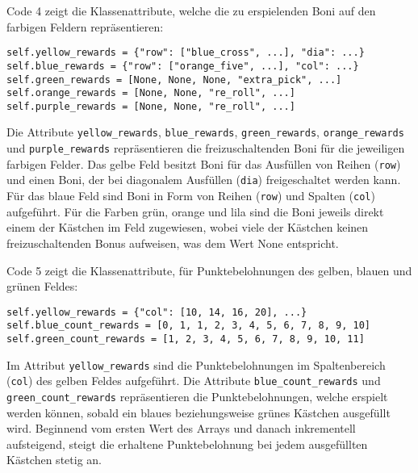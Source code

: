 \begin{minipage}{\linewidth}
Code 4 zeigt die Klassenattribute, welche die zu erspielenden Boni auf den farbigen Feldern repräsentieren:
\vspace{0.5cm}
\begin{lstlisting}[caption={Klassenattribute für freizuschaltende Boni}, basicstyle=\ttfamily]
self.yellow_rewards = {"row": ["blue_cross", ...], "dia": ...}
self.blue_rewards = {"row": ["orange_five", ...], "col": ...}
self.green_rewards = [None, None, None, "extra_pick", ...]
self.orange_rewards = [None, None, "re_roll", ...]
self.purple_rewards = [None, None, "re_roll", ...]
\end{lstlisting}
\end{minipage}

Die Attribute \texttt{yellow\_rewards}, \texttt{blue\_rewards}, \texttt{green\_rewards}, \texttt{orange\_rewards} und \texttt{purple\_rewards} repräsentieren die freizuschaltenden Boni für die jeweiligen farbigen Felder. Das gelbe Feld besitzt Boni für das Ausfüllen von Reihen (\texttt{row}) und einen Boni, der bei diagonalem Ausfüllen (\texttt{dia}) freigeschaltet werden kann. Für das blaue Feld sind Boni in Form von Reihen (\texttt{row}) und Spalten (\texttt{col}) aufgeführt. Für die Farben grün, orange und lila sind die Boni jeweils direkt einem der Kästchen im Feld zugewiesen, wobei viele der Kästchen keinen freizuschaltenden Bonus aufweisen, was dem Wert None entspricht.\\

\begin{minipage}{\linewidth}
Code 5 zeigt die Klassenattribute, für Punktebelohnungen des gelben, blauen und grünen Feldes:
\vspace{0.5cm}
\begin{lstlisting}[caption={Klassenattribute für freizuschaltende Punktebelohnungen des gelben, blauen und grünen Feldes}, basicstyle=\ttfamily]
self.yellow_rewards = {"col": [10, 14, 16, 20], ...}
self.blue_count_rewards = [0, 1, 1, 2, 3, 4, 5, 6, 7, 8, 9, 10]
self.green_count_rewards = [1, 2, 3, 4, 5, 6, 7, 8, 9, 10, 11]
\end{lstlisting}
\end{minipage}

Im Attribut \texttt{yellow\_rewards} sind die Punktebelohnungen im Spaltenbereich (\texttt{col}) des gelben Feldes aufgeführt. Die Attribute \texttt{blue\_count\_rewards} und \texttt{green\_count\_rewards} repräsentieren die Punktebelohnungen, welche erspielt werden können, sobald ein blaues beziehungsweise grünes Kästchen ausgefüllt wird. Beginnend vom ersten Wert des Arrays und danach inkrementell aufsteigend, steigt die erhaltene Punktebelohnung bei jedem ausgefüllten Kästchen stetig an.\\

